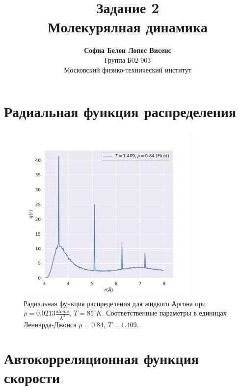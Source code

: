 \documentclass[a4paper,12pt]{article}
\author{\textbf{Софиа Белен Лопес Висенс}\\
    Группа Б02-903\\ 
\large Московский физико-технический институт}
\title{\textbf{Задание 2}\\
Молекурялная динамика}
\date{}
\begin{document}
\maketitle
\newpage
\tableofcontents
\newpage

\section{Радиальная функция распределения}

\begin{figure}[H]
    \centering
    \includegraphics[width=0.8\textwidth]{../../media/rdfYarnell.pdf}
\caption{Радиальная функция распределения для жидкого Аргона
при \(\rho = 0.0213 \frac{atoms}{\si{\angstrom}^3}\), 
\(T = 85^\circ K\). Соответственные параметры в единицах
Леннарда-Джонса \(\rho = 0.84\), \(T = 1.409\).}
\end{figure}

\section{Автокорреляционная функция скорости}
\end{document}
